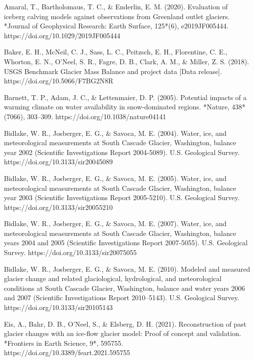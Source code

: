 \documentclass{article}
\begin{document}
\begin{thebibliography}{}

    Amaral, T., Bartholomaus, T. C., \& Enderlin, E. M. (2020). Evaluation of iceberg calving models against observations from Greenland outlet glaciers. *Journal of Geophysical Research: Earth Surface, 125*(6), e2019JF005444. https://doi.org/10.1029/2019JF005444

    Baker, E. H., McNeil, C. J., Sass, L. C., Peitzsch, E. H., Florentine, C. E., Whorton, E. N., O’Neel, S. R., Fagre, D. B., Clark, A. M., \& Miller, Z. S. (2018). USGS Benchmark Glacier Mass Balance and project data [Data release]. https://doi.org/10.5066/F7BG2N8R

    Barnett, T. P., Adam, J. C., \& Lettenmaier, D. P. (2005). Potential impacts of a warming climate on water availability in snow-dominated regions. *Nature, 438*(7066), 303–309. https://doi.org/10.1038/nature04141

    Bidlake, W. R., Josberger, E. G., \& Savoca, M. E. (2004). Water, ice, and meteorological measurements at South Cascade Glacier, Washington, balance year 2002 (Scientific Investigations Report 2004-5089). U.S. Geological Survey. https://doi.org/10.3133/sir20045089
    
    Bidlake, W. R., Josberger, E. G., \& Savoca, M. E. (2005). Water, ice, and meteorological measurements at South Cascade Glacier, Washington, balance year 2003 (Scientific Investigations Report 2005-5210). U.S. Geological Survey. https://doi.org/10.3133/sir20055210

    Bidlake, W. R., Josberger, E. G., \& Savoca, M. E. (2007). Water, ice, and meteorological measurements at South Cascade Glacier, Washington, balance years 2004 and 2005 (Scientific Investigations Report 2007-5055). U.S. Geological Survey. https://doi.org/10.3133/sir20075055

    Bidlake, W. R., Josberger, E. G., \& Savoca, M. E. (2010). Modeled and measured glacier change and related glaciological, hydrological, and meteorological conditions at South Cascade Glacier, Washington, balance and water years 2006 and 2007 (Scientific Investigations Report 2010–5143). U.S. Geological Survey. https://doi.org/10.3133/sir20105143

    Eis, A., Bahr, D. B., O’Neel, S., \& Elsberg, D. H. (2021). Reconstruction of past glacier changes with an ice-flow glacier model: Proof of concept and validation. *Frontiers in Earth Science, 9*, 595755. https://doi.org/10.3389/feart.2021.595755


\end{thebibliography}
\end{document}
